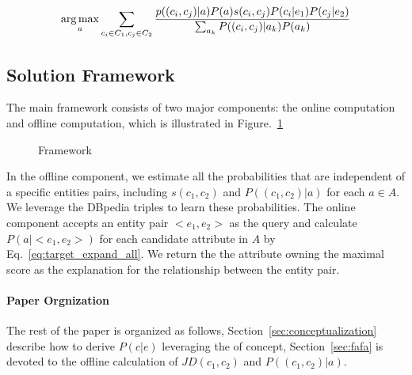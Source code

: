 \begin{equation}
\label{eq:target_expand_all}
\begin{split}
 \operatorname*{arg\,max}_a \sum_{c_i\in C_1, c_j\in C_2}\frac{ p((c_{i},c_{j})|a) P(a) s(c_i,c_j) P(c_i|e_1) P(c_j|e_2) }{ \sum_{a_k}{P( (c_{i},c_{j})|a_k) P(a_k)   } }
\end{split}
\end{equation}



\subsection{Solution Framework}
The main framework consists of two major components: the online computation and offline computation, which is illustrated in Figure.~\ref{fig:framework} 

\begin{figure}[!hptb]
\label{fig:framework}
\centering
{}
\caption{Framework }
\end{figure}


In the offline component, we estimate all the probabilities that are independent of a specific entities pairs, including $s(c_1,c_2)$ and $P((c_{1},c_{2})|a)$ for each $a\in A$.
We leverage the DBpedia triples to learn these probabilities.
The online component accepts an entity pair $<e_1, e_2>$ as the query and calculate $ P(a| <e_1,e_2> )$ for each candidate attribute in $A$ by Eq.~\ref{eq:target_expand_all}. We return the the attribute owning the maximal score as the explanation for the relationship between the entity pair.


\paragraph{Paper Orgnization}
The rest of the paper is organized as follows, Section~\ref{sec:conceptualization} describe how to derive $P(c|e)$ leveraging the  of concept, Section~\ref{sec:fafa} is devoted to the offline calculation of $JD(c_1,c_2)$ and $P((c_{1},c_{2})|a)$.


